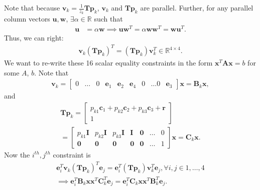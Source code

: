 \documentclass{article}
\begin{document}
Note that because $\mathbf{v}_k = \frac{1}{z_k} \mathbf{T} \mathbf{p}_k$, $\mathbf{v}_k$ and $\mathbf{T} \mathbf{p}_k$ are parallel.
Further, for any parallel column vectors $\mathbf{u}, \mathbf{w}$, $\exists \alpha \in \mathbb{R}$ such that
\begin{align}
    \mathbf{u} &= \alpha \mathbf{w}
    \implies \mathbf{u}\mathbf{w}^T = \alpha \mathbf{w}\mathbf{w}^T = \mathbf{w} \mathbf{u}^T.
\end{align}
Thus, we can right:
\begin{align}
    \mathbf{v}_k (\mathbf{T} \mathbf{p}_k)^T = (\mathbf{T} \mathbf{p}_k)\mathbf{v}_k^T \in \mathbb{R}^{4 \times 4}.
\end{align}
We want to re-write these 16 scalar equality constraints in the form $\mathbf{x}^T \mathbf{A} \mathbf{x} = b$ for some $A$, $b$.
Note that
\begin{align}
    \mathbf{v}_k = \begin{bmatrix}
        0 & \dots & 0 & \mathbf{e}_1 & \mathbf{e}_2 & \mathbf{e}_4 & 0 & \dots 0 & \mathbf{e}_3
    \end{bmatrix} \mathbf{x} = \mathbf{B}_k \mathbf{x},
\end{align}
and
\begin{align}
    \mathbf{T} \mathbf{p}_k = \begin{bmatrix}
        p_{k1} \mathbf{c}_1 + p_{k2} \mathbf{c}_2 + p_{k3} \mathbf{c}_3 + \mathbf{r} \\
        1
    \end{bmatrix} \\
    = \begin{bmatrix}
        p_{k1} \mathbf{I} & p_{k2} \mathbf{I} & p_{k3} \mathbf{I}  & \mathbf{I} & \mathbf{0} & \dots & 0 \\
        \mathbf{0}        & \mathbf{0}        & \mathbf{0}         & \mathbf{0} & \mathbf{0} & \dots & 1
    \end{bmatrix} \mathbf{x} = \mathbf{C}_k \mathbf{x}.
\end{align}
Now the $i^{th}, j^{th}$ constraint is
\begin{align}
    \mathbf{e}_i^T \mathbf{v}_k (\mathbf{T} \mathbf{p}_k)^T \mathbf{e}_j = \mathbf{e}_i^T (\mathbf{T} \mathbf{p}_k)\mathbf{v}_k^T \mathbf{e}_j, \forall i,j \in {1, \dots, 4} \\
    \implies
    \mathbf{e}_i^T  \mathbf{B}_k \mathbf{x} \mathbf{x}^T \mathbf{C}_k^T \mathbf{e}_j = \mathbf{e}_i^T  \mathbf{C}_k \mathbf{x} \mathbf{x}^T \mathbf{B}_k^T \mathbf{e}_j.
\end{align}
\end{document}
